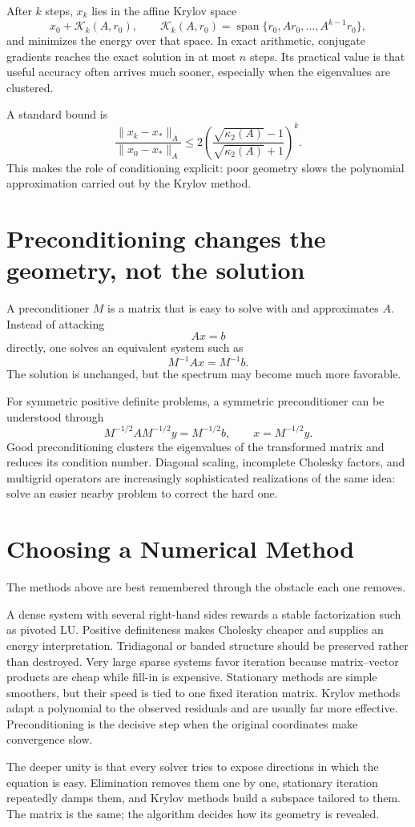 After \(k\) steps, \(x_k\) lies in the affine Krylov space
\[
  x_0+\mathcal K_k(A,r_0),
  \qquad
  \mathcal K_k(A,r_0)
  =\operatorname{span}\{r_0,Ar_0,\ldots,A^{k-1}r_0\},
\]
and minimizes the energy over that space.  In exact arithmetic, conjugate gradients reaches the exact solution in at most \(n\) steps.  Its practical value is that useful accuracy often arrives much sooner, especially when the eigenvalues are clustered.

A standard bound is
\[
  \frac{\|x_k-x_*\|_A}{\|x_0-x_*\|_A}
  \le
  2\left(
    \frac{\sqrt{\kappa_2(A)}-1}
         {\sqrt{\kappa_2(A)}+1}
  \right)^k.
\]
This makes the role of conditioning explicit: poor geometry slows the polynomial approximation carried out by the Krylov method.

\section{Preconditioning changes the geometry, not the solution}

A preconditioner \(M\) is a matrix that is easy to solve with and approximates \(A\).  Instead of attacking
\[
  Ax=b
\]
directly, one solves an equivalent system such as
\[
  M^{-1}Ax=M^{-1}b.
\]
The solution is unchanged, but the spectrum may become much more favorable.

For symmetric positive definite problems, a symmetric preconditioner can be understood through
\[
  M^{-1/2}AM^{-1/2}y=M^{-1/2}b,
  \qquad x=M^{-1/2}y.
\]
Good preconditioning clusters the eigenvalues of the transformed matrix and reduces its condition number.  Diagonal scaling, incomplete Cholesky factors, and multigrid operators are increasingly sophisticated realizations of the same idea: solve an easier nearby problem to correct the hard one.

\section{Choosing a Numerical Method}

The methods above are best remembered through the obstacle each one removes.

A dense system with several right-hand sides rewards a stable factorization such as pivoted LU.  Positive definiteness makes Cholesky cheaper and supplies an energy interpretation.  Tridiagonal or banded structure should be preserved rather than destroyed.  Very large sparse systems favor iteration because matrix--vector products are cheap while fill-in is expensive.  Stationary methods are simple smoothers, but their speed is tied to one fixed iteration matrix.  Krylov methods adapt a polynomial to the observed residuals and are usually far more effective.  Preconditioning is the decisive step when the original coordinates make convergence slow.

The deeper unity is that every solver tries to expose directions in which the equation is easy.  Elimination removes them one by one, stationary iteration repeatedly damps them, and Krylov methods build a subspace tailored to them.  The matrix is the same; the algorithm decides how its geometry is revealed.
